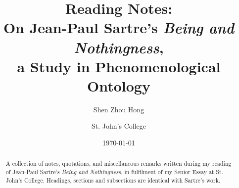 \documentclass[
  10pt,       %
  letterpaper,    %
  final,      %
  onecolumn,  %
  oneside,    %
  notitlepage %
]{article}
\title{
  \textbf{Reading Notes:} \\
  On Jean-Paul Sartre's \emph{Being and Nothingness},\\
  a Study in Phenomenological Ontology
}
\author{
  Shen Zhou Hong \and St. John's College
}
\date{\today}
\begin{document}
\maketitle
\begin{abstract}
\noindent
  A collection of notes, quotations, and miscellaneous remarks written during my reading of Jean-Paul Sartre's \emph{Being and Nothingness}, in fulfilment of my Senior Essay at St. John's College. Headings, sections and subsections are identical with Sartre's work.
\end{abstract}
\tableofcontents %

% 













\appendix

\end{document}

